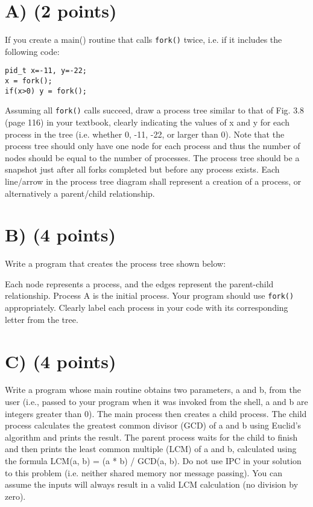 \documentclass{article}
\begin{document}
\section*{A) (2 points)}
If you create a main() routine that calls \texttt{fork()} twice, i.e. if it includes the following code:
\begin{verbatim}
pid_t x=-11, y=-22;
x = fork();
if(x>0) y = fork();
\end{verbatim}
Assuming all \texttt{fork()} calls succeed, draw a process tree similar to that of Fig. 3.8 (page 116) in your textbook, clearly indicating the values of x and y for each process in the tree (i.e. whether 0, -11, -22, or larger than 0).
Note that the process tree should only have one node for each process and thus the number of nodes should be equal to the number of processes.
The process tree should be a snapshot just after all forks completed but before any process exists.
Each line/arrow in the process tree diagram shall represent a creation of a process, or alternatively a parent/child relationship.




\section*{B) (4 points)}
Write a program that creates the process tree shown below:

\begin{center}
\end{center}
Each node represents a process, and the edges represent the parent-child relationship.  Process A is the initial process.  Your program should use \texttt{fork()} appropriately.  Clearly label each process in your code with its corresponding letter from the tree.





\section*{C) (4 points)}
Write a program whose main routine obtains two parameters, a and b, from the user (i.e., passed to your program when it was invoked from the shell, a and b are integers greater than 0).  The main process then creates a child process. The child process calculates the greatest common divisor (GCD) of a and b using Euclid's algorithm and prints the result.  The parent process waits for the child to finish and then prints the least common multiple (LCM) of a and b, calculated using the formula LCM(a, b) = (a * b) / GCD(a, b). Do not use IPC in your solution to this problem (i.e. neither shared memory nor message passing).  You can assume the inputs will always result in a valid LCM calculation (no division by zero).
\end{document}
